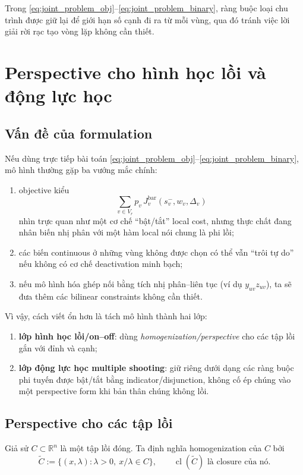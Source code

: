 \documentclass[12pt]{article}
\begin{document}
Trong \eqref{eq:joint_problem_obj}--\eqref{eq:joint_problem_binary}, ràng buộc loại chu trình được giữ lại để giới hạn số cạnh đi ra từ mỗi vùng, qua đó tránh việc lời giải rời rạc tạo vòng lặp không cần thiết.

\section{Perspective cho hình học lồi và động lực học}

\subsection{Vấn đề của formulation}
Nếu dùng trực tiếp bài toán \eqref{eq:joint_problem_obj}--\eqref{eq:joint_problem_binary}, mô hình thường gặp ba vướng mắc chính:
\begin{enumerate}
    \item objective kiểu
    \[
    \sum_{v\in V_r} p_v\,J_v^{\mathrm{bar}}(s_v^-,w_v,\Delta_v)
    \]
    nhìn trực quan như một cơ chế ``bật/tắt'' local cost, nhưng thực chất đang nhân biến nhị phân với một hàm local nói chung là phi lồi;
    \item các biến continuous ở những vùng không được chọn có thể vẫn ``trôi tự do'' nếu không có cơ chế deactivation minh bạch;
    \item nếu mô hình hóa ghép nối bằng tích nhị phân--liên tục (ví dụ $y_{uv}z_{uv}$), ta sẽ đưa thêm các bilinear constraints không cần thiết.
\end{enumerate}

Vì vậy, cách viết ổn hơn là tách mô hình thành hai lớp:
\begin{enumerate}
    \item \textbf{lớp hình học lồi/on--off}: dùng \emph{homogenization/perspective} cho các tập lồi gắn với đỉnh và cạnh;
    \item \textbf{lớp động lực học multiple shooting}: giữ riêng dưới dạng các ràng buộc phi tuyến được bật/tắt bằng indicator/disjunction, không cố ép chúng vào một perspective form khi bản thân chúng không lồi.
\end{enumerate}

\subsection{Perspective cho các tập lồi}
Giả sử $C\subset\mathbb R^n$ là một tập lồi đóng. Ta định nghĩa homogenization của $C$ bởi
\begin{equation}
\widetilde C:=\{(x,\lambda):\lambda>0,\ x/\lambda\in C\},
\qquad
\operatorname{cl}(\widetilde C)
\text{ là closure của nó.}
\label{eq:homogenized-set}
\end{equation}
\end{document}
